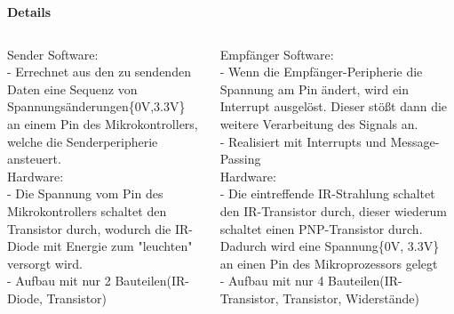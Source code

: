 \documentclass{beamer}
\begin{document}
\begin{frame}
\begin{block}{\textbf{Details}}
\begin{columns}[t]
\begin{column}{.45\linewidth}
		\begin{block}{Sender}
			Software:\\
			- Errechnet aus den zu sendenden Daten eine Sequenz von Spannungsänderungen\{0V,3.3V\} an einem Pin des Mikrokontrollers, welche die Senderperipherie ansteuert.\\
			Hardware:\\
			- Die Spannung vom Pin des Mikrokontrollers schaltet den Transistor durch, wodurch die IR-Diode mit Energie zum "leuchten" versorgt wird.\\
			- Aufbau mit nur 2 Bauteilen(IR-Diode, Transistor)\\
			~\\
		\end{block}
	  \end{column}
      \begin{column}{0.45\linewidth}
		\begin{block}{Empfänger}
			Software:\\
			- Wenn die Empfänger-Peripherie die Spannung am Pin ändert, wird ein Interrupt ausgelöst. Dieser stößt dann die weitere Verarbeitung des Signals an.\\
			- Realisiert mit Interrupts und Message-Passing\\
			Hardware:\\
			- Die eintreffende IR-Strahlung schaltet den IR-Transistor durch, dieser wiederum schaltet einen PNP-Transistor durch. Dadurch wird eine Spannung\{0V, 3.3V\} an einen Pin des Mikroprozessors gelegt\\
			- Aufbau mit nur 4 Bauteilen(IR-Transistor, Transistor, Widerstände)\\
		\end{block}
	  \end{column}
	\end{columns}
	\vspace{10pt}
  \end{block}
\end{frame}
\end{document}
